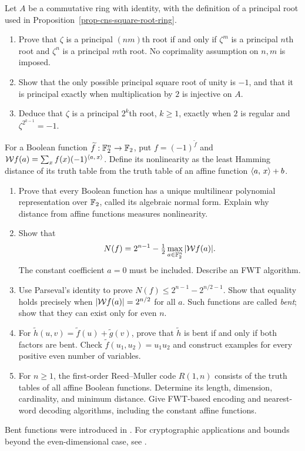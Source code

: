 \begin{exo}
\label{exo-root-square-primitive}
Let $A$ be a commutative ring with identity, with the definition of a
principal root used in Proposition~\ref{prop-cns-square-root-ring}.
\begin{enumerate}
\item Prove that $\zeta$ is a principal $(nm)$th root if and only if
$\zeta^m$ is a principal $n$th root and $\zeta^n$ is a principal $m$th root.
No coprimality assumption on $n,m$ is imposed.
\item Show that the only possible principal square root of unity is
$-1$, and that it is principal exactly when multiplication by $2$ is
injective on $A$.
\item Deduce that $\zeta$ is a principal $2^k$th root, $k\geq1$, exactly
when $2$ is regular and $\zeta^{2^{k-1}}=-1$.
\end{enumerate}
\end{exo}


\begin{exo}
\label{exo-boolean-functions}
For a Boolean function $\widetilde f:\mathbb{F}_2^n\to\mathbb{F}_2$, put
$f=(-1)^{\widetilde f}$ and $\mathcal{W} f(a)=\sum_xf(x)(-1)^{\langle a,\,x\rangle}$.
Define its nonlinearity as the least Hamming distance of its truth table
from the truth table of an affine function $\langle a,\,x\rangle+b$.
\begin{enumerate}
\item Prove that every Boolean function has a unique multilinear
polynomial representation over $\mathbb{F}_2$, called its algebraic normal form.
Explain why distance from affine functions measures nonlinearity.
\item Show that
\[
 N(f)=2^{n-1}-\tfrac12\max_{a\in\mathbb{F}_2^n}|\mathcal{W} f(a)|.
\]
The constant coefficient $a=0$ must be included. Describe an FWT algorithm.
\item Use Parseval's identity to prove
$N(f)\leq2^{n-1}-2^{n/2-1}$. Show that equality holds precisely when
$|\mathcal{W} f(a)|=2^{n/2}$ for all $a$. Such functions are called \emph{bent};
show that they can exist only for even $n$.
\item For $\widetilde h(u,v)=\widetilde f(u)+\widetilde g(v)$, prove that
$\widetilde h$ is bent if and only if both factors are bent. Check
$\widetilde f(u_1,u_2)=u_1u_2$ and construct examples for every positive
even number of variables.
\item For $n\geq1$, the first-order Reed--Muller code $R(1,n)$ consists
of the truth tables of all affine Boolean functions. Determine its length,
dimension, cardinality, and minimum distance. Give FWT-based encoding and
nearest-word decoding algorithms, including the constant affine functions.
\end{enumerate}
Bent functions were introduced in \cite{rothaus-bent}. For cryptographic
applications and bounds beyond the even-dimensional case, see
\cite{passalic-boolean}.
\end{exo}

